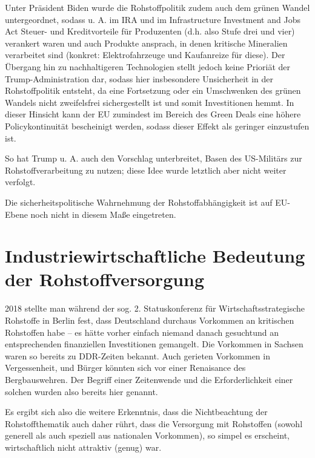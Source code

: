 \documentclass[12pt,a4paper,oneside]{book} %
\begin{document}
Unter Präsident Biden wurde die Rohstoffpolitik zudem auch dem grünen Wandel untergeordnet, sodass u. A. im IRA und im Infrastructure Investment and Jobs Act Steuer- und Kreditvorteile für Produzenten (d.h. also Stufe drei und vier) verankert waren und auch Produkte ansprach, in denen kritische Mineralien verarbeitet sind (konkret: Elektrofahrzeuge und Kaufanreize für diese). Der Übergang hin zu nachhaltigeren Technologien stellt jedoch keine Prioriät der Trump-Administration dar, sodass hier insbesondere Unsicherheit in der Rohstoffpolitik entsteht, da eine Fortsetzung oder ein Umschwenken des grünen Wandels nicht zweifelsfrei sichergestellt ist und somit Investitionen hemmt. In dieser Hinsicht kann der EU zumindest im Bereich des Green Deals eine höhere Policykontinuität bescheinigt werden, sodass dieser Effekt als geringer einzustufen ist.



So hat Trump u. A. auch den Vorschlag unterbreitet, Basen des US-Militärs zur Rohstoffverarbeitung zu nutzen; diese Idee wurde letztlich aber nicht weiter verfolgt.

Die sicherheitspolitische Wahrnehmung der Rohstoffabhängigkeit ist auf EU-Ebene noch nicht in diesem Maße eingetreten.


\section{Industriewirtschaftliche Bedeutung der Rohstoffversorgung}


2018 stellte man während der sog. 2. Statuskonferenz für Wirtschaftsstrategische Rohstoffe in Berlin fest, dass Deutschland durchaus Vorkommen an kritischen Rohstoffen habe -- es hätte vorher \glqq einfach niemand danach gesucht\grqq und an entsprechenden finanziellen Investitionen gemangelt.\autocite{VDINachrichten: Rohstoffe: Deutschland ist reich an seltenen Erden} Die Vorkommen in Sachsen waren so bereits zu DDR-Zeiten bekannt. Auch gerieten Vorkommen in Vergessenheit, und Bürger könnten sich vor einer \glqq Renaisance des Bergbaus\grqq wehren. Der Begriff einer Zeitenwende und die Erforderlichkeit einer solchen wurden also bereits hier genannt.





Es ergibt sich also die weitere Erkenntnis, dass die Nichtbeachtung der Rohstoffthematik auch daher rührt, dass die Versorgung mit Rohstoffen (sowohl generell als auch speziell aus nationalen Vorkommen), so simpel es erscheint, wirtschaftlich nicht attraktiv (genug) war.
\end{document}
